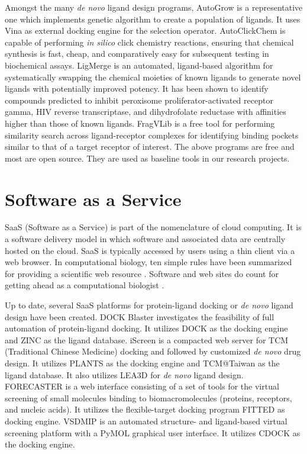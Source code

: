 Amongst the many \textit{de novo} ligand design programs, AutoGrow \citep{466} is a representative one which implements genetic algorithm to create a population of ligands. It uses Vina \citep{595} as external docking engine for the selection operator. AutoClickChem \citep{1051} is capable of performing \textit{in silico} click chemistry reactions, ensuring that chemical synthesis is fast, cheap, and comparatively easy for subsequent testing in biochemical assays. LigMerge \citep{1181} is an automated, ligand-based algorithm for systematically swapping the chemical moieties of known ligands to generate novel ligands with potentially improved potency. It has been shown to identify compounds predicted to inhibit peroxisome proliferator-activated receptor gamma, HIV reverse transcriptase, and dihydrofolate reductase with affinities higher than those of known ligands. FragVLib \citep{1247} is a free tool for performing similarity search across ligand-receptor complexes for identifying binding pockets similar to that of a target receptor of interest. The above programs are free and most are open source. They are used as baseline tools in our research projects.

\section{Software as a Service}

SaaS (Software as a Service) is part of the nomenclature of cloud computing. It is a software delivery model in which software and associated data are centrally hosted on the cloud. SaaS is typically accessed by users using a thin client via a web browser. In computational biology, ten simple rules have been summarized for providing a scientific web resource \citep{677}. Software and web sites do count for getting ahead as a computational biologist \citep{260}.

Up to date, several SaaS platforms for protein-ligand docking or \textit{de novo} ligand design have been created. DOCK Blaster \citep{557} investigates the feasibility of full automation of protein-ligand docking. It utilizes DOCK \citep{1222} as the docking engine and ZINC \citep{532,1178} as the ligand database. iScreen \citep{899} is a compacted web server for TCM (Traditional Chinese Medicine) docking and followed by customized \textit{de novo} drug design. It utilizes PLANTS \citep{610,607,779} as the docking engine and TCM@Taiwan \citep{528} as the ligand database. It also utilizes LEA3D \citep{1223} for \textit{de novo} ligand design. FORECASTER \citep{1012} is a web interface consisting of a set of tools for the virtual screening of small molecules binding to biomacromolecules (proteins, receptors, and nucleic acids). It utilizes the flexible-target docking program FITTED \citep{602} as docking engine. VSDMIP \citep{848} is an automated structure- and ligand-based virtual screening platform with a PyMOL graphical user interface. It utilizes CDOCK \citep{1224} as the docking engine.

